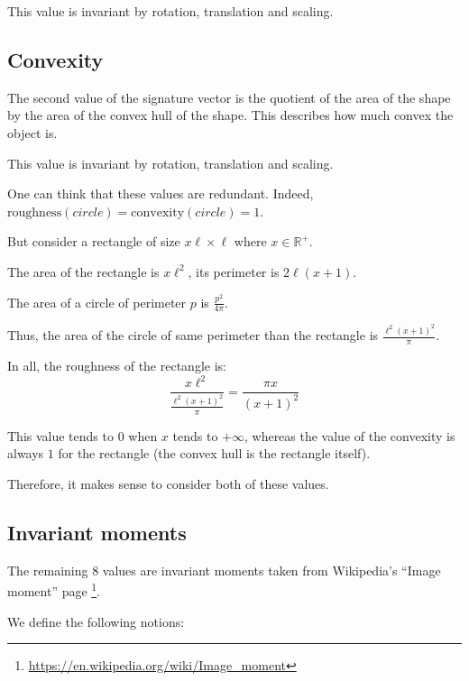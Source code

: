 \documentclass[a4paper,12pt]{article}
\newcommand{\R}{\mathbb{R}}
\theoremstyle{example}
\theoremstyle{remark}
\theoremstyle{definition}
\begin{document}
This value is invariant by rotation, translation and scaling.

\subsection{Convexity}

The second value of the signature vector is the quotient of the area of the shape by the area of the convex hull of the shape. This describes how much convex the object is.

This value is invariant by rotation, translation and scaling.

One can think that these values are redundant. Indeed, $\mathrm{roughness}(circle) = \mathrm{convexity}(circle) = 1$.

But consider a rectangle of size $x\ell \times \ell$ where $x \in \R^+$.

The area of the rectangle is $x\ell^2$, its perimeter is $2\ell(x+1)$.

The area of a circle of perimeter $p$ is $\frac{p^2}{4\pi}$.

Thus, the area of the circle of same perimeter than the rectangle is $\frac{\ell^2(x+1)^2}{\pi}$.

In all, the roughness of the rectangle is:
\[\frac{x\ell^2}{\frac{\ell^2(x+1)^2}{\pi}} = \frac{\pi x}{(x+1)^2}\]

This value tends to $0$ when $x$ tends to $+\infty$, whereas the value of the convexity is always $1$ for the rectangle (the convex hull is the rectangle itself).

Therefore, it makes sense to consider both of these values.

\subsection{Invariant moments}

The remaining 8 values are invariant moments taken from Wikipedia's ``Image moment'' page \footnote{\url{https://en.wikipedia.org/wiki/Image_moment}}.

We define the following notions:
\end{document}
